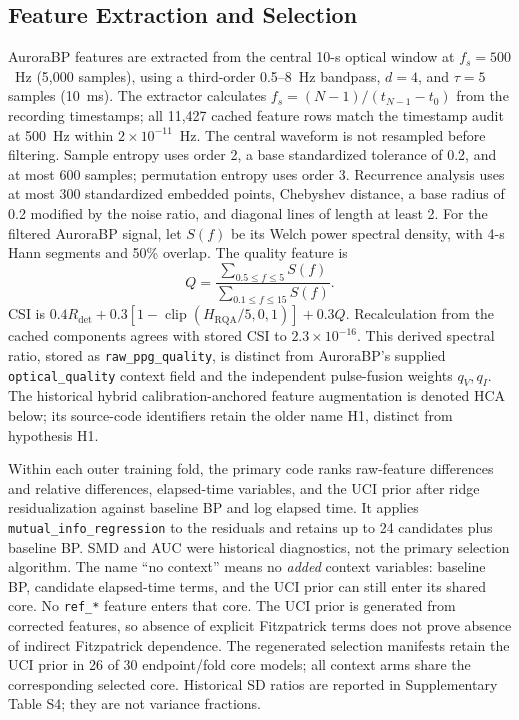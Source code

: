 \documentclass[12pt]{article}
\begin{document}
\subsection{Feature Extraction and Selection}
\label{sec:features}
AuroraBP features are extracted from the central 10-s optical window at $f_s=500$~Hz (5{,}000 samples), using a third-order 0.5--8~Hz bandpass, $d=4$, and $\tau=5$ samples (10~ms). The extractor calculates $f_s=(N-1)/(t_{N-1}-t_0)$ from the recording timestamps; all 11{,}427 cached feature rows match the timestamp audit at 500~Hz within $2\times10^{-11}$~Hz. The central waveform is not resampled before filtering. Sample entropy uses order 2, a base standardized tolerance of 0.2, and at most 600 samples; permutation entropy uses order 3. Recurrence analysis uses at most 300 standardized embedded points, Chebyshev distance, a base radius of 0.2 modified by the noise ratio, and diagonal lines of length at least 2. For the filtered AuroraBP signal, let $S(f)$ be its Welch power spectral density, with 4-s Hann segments and 50\% overlap. The quality feature is
\begin{equation}
Q=\frac{\sum_{0.5\le f\le5}S(f)}{\sum_{0.1\le f\le15}S(f)}.
\label{eq:auroraquality}
\end{equation}
CSI is $0.4R_{\mathrm{det}}+0.3[1-\operatorname{clip}(H_{\mathrm{RQA}}/5,0,1)]+0.3Q$. Recalculation from the cached components agrees with stored CSI to $2.3\times10^{-16}$. This derived spectral ratio, stored as \texttt{raw\_ppg\_quality}, is distinct from AuroraBP's supplied \texttt{optical\_quality} context field and the independent pulse-fusion weights $q_V,q_I$. The historical hybrid calibration-anchored feature augmentation is denoted HCA below; its source-code identifiers retain the older name H1, distinct from hypothesis H1.

Within each outer training fold, the primary code ranks raw-feature differences and relative differences, elapsed-time variables, and the UCI prior after ridge residualization against baseline BP and log elapsed time. It applies \texttt{mutual\_info\_regression} to the residuals and retains up to 24 candidates plus baseline BP. SMD and AUC were historical diagnostics, not the primary selection algorithm. The name ``no context'' means no \emph{added} context variables: baseline BP, candidate elapsed-time terms, and the UCI prior can still enter its shared core. No \texttt{ref\_*} feature enters that core. The UCI prior is generated from corrected features, so absence of explicit Fitzpatrick terms does not prove absence of indirect Fitzpatrick dependence. The regenerated selection manifests retain the UCI prior in 26 of 30 endpoint/fold core models; all context arms share the corresponding selected core. Historical SD ratios are reported in Supplementary Table S4; they are not variance fractions.
\end{document}
